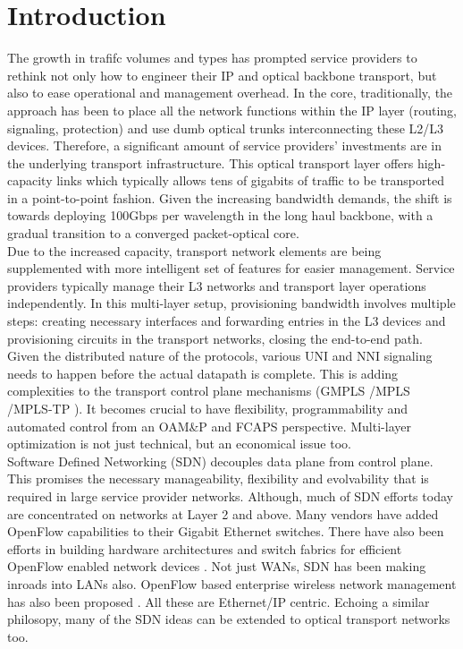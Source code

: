 \documentclass{sig-alternate-10pt}
\begin{document}


\section{Introduction}
	The growth in trafifc volumes and types has prompted service providers to rethink not only how to
	engineer their IP and optical backbone transport, but also to ease operational and management overhead.
	In the core, traditionally, the approach has been to place all the network functions within the IP layer
	(routing, signaling, protection) and use dumb optical trunks interconnecting these L2/L3 devices.
	Therefore, a significant amount of service providers' investments are in the underlying transport
	infrastructure. This optical transport layer offers high-capacity links which typically allows tens of
	gigabits of traffic to be transported in a point-to-point fashion. Given the increasing bandwidth
	demands, the shift is towards deploying 100Gbps per wavelength in the long haul backbone, with a gradual
	transition to a converged packet-optical core. \\
			
	Due to the increased capacity, transport network elements are being supplemented with more intelligent
	set of features for easier management. Service providers typically manage their L3 networks and transport
	layer operations independently. In this multi-layer setup, provisioning bandwidth involves multiple
	steps: creating necessary interfaces and forwarding entries in the L3 devices and provisioning circuits
	in the transport networks, closing the end-to-end path. Given the distributed nature of the protocols,
	various UNI and NNI signaling needs to happen before the actual datapath is complete. This is adding
	complexities to the transport control plane mechanisms (GMPLS \cite{gmpls}/MPLS \cite{mpls}/MPLS-TP
	\cite{mpls-tp}). It becomes crucial to have flexibility, programmability and automated control from an
	OAM\&P and FCAPS perspective. Multi-layer optimization is not just technical, but an economical issue
	too. \\
		
	Software Defined Networking (SDN) decouples data plane from control plane. This promises the necessary
	manageability, flexibility and evolvability that is required in large service provider networks.
	Although, much of SDN efforts today are concentrated on networks at Layer 2 and above. Many vendors have
	added OpenFlow capabilities to their Gigabit Ethernet switches. There have also been efforts in building
	hardware architectures \cite{Mogul2012} and switch fabrics for efficient OpenFlow enabled network devices
	\cite{Casado2012}. Not just WANs, SDN has been making inroads into LANs also. OpenFlow based enterprise
	wireless network management has also been proposed \cite{Suresh2012}. All these are Ethernet/IP centric.
	Echoing a similar philosopy, many of the SDN ideas can be extended to optical transport networks too.
\end{document}
